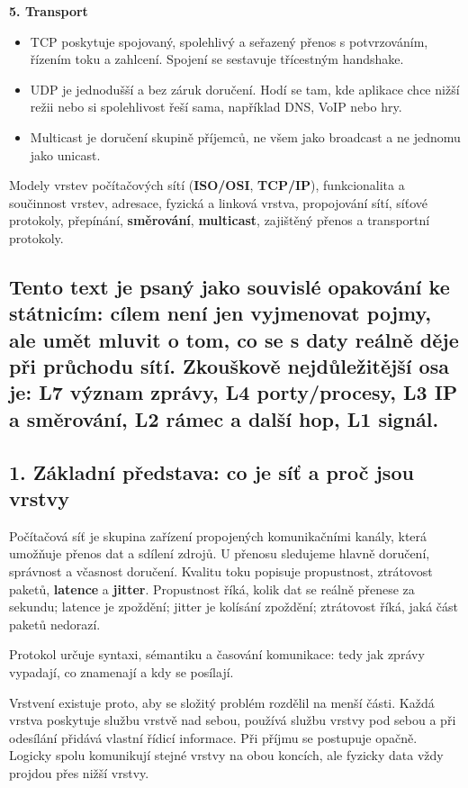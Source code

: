 \textbf{5. Transport}
\begin{itemize}
  \item TCP poskytuje spojovaný, spolehlivý a seřazený přenos s potvrzováním, řízením toku a zahlcení. Spojení se sestavuje třícestným handshake.
  \item UDP je jednodušší a bez záruk doručení. Hodí se tam, kde aplikace chce nižší režii nebo si spolehlivost řeší sama, například DNS, VoIP nebo hry.
  \item Multicast je doručení skupině příjemců, ne všem jako broadcast a ne jednomu jako unicast.
\end{itemize}

Modely vrstev počítačových sítí (\textbf{ISO/OSI}, \textbf{TCP/IP}), funkcionalita a součinnost vrstev, adresace, fyzická a linková vrstva, propojování sítí, síťové protokoly, přepínání, \textbf{směrování}, \textbf{multicast}, zajištěný přenos a transportní protokoly.

\subsection*{Tento text je psaný jako souvislé opakování ke státnicím: cílem není jen vyjmenovat pojmy, ale umět mluvit o tom, co se s daty reálně děje při průchodu sítí. Zkouškově nejdůležitější osa je: L7 význam zprávy, L4 porty/procesy, L3 IP a směrování, L2 rámec a další hop, L1 signál.}

\subsection*{1. Základní představa: co je síť a proč jsou vrstvy}

Počítačová síť je skupina zařízení propojených komunikačními kanály, která umožňuje přenos dat a sdílení zdrojů. U přenosu sledujeme hlavně doručení, správnost a včasnost doručení. Kvalitu toku popisuje propustnost, ztrátovost paketů, \textbf{latence} a \textbf{jitter}. Propustnost říká, kolik dat se reálně přenese za sekundu; latence je zpoždění; jitter je kolísání zpoždění; ztrátovost říká, jaká část paketů nedorazí.

Protokol určuje syntaxi, sémantiku a časování komunikace: tedy jak zprávy vypadají, co znamenají a kdy se posílají.

Vrstvení existuje proto, aby se složitý problém rozdělil na menší části. Každá vrstva poskytuje službu vrstvě nad sebou, používá službu vrstvy pod sebou a při odesílání přidává vlastní řídicí informace. Při příjmu se postupuje opačně. Logicky spolu komunikují stejné vrstvy na obou koncích, ale fyzicky data vždy projdou přes nižší vrstvy.

